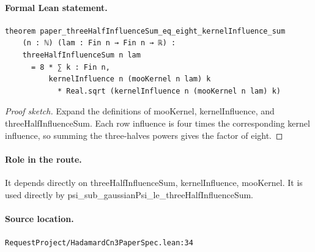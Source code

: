 \medskip
\paragraph{Formal Lean statement.}
\begin{verbatim}
theorem paper_threeHalfInfluenceSum_eq_eight_kernelInfluence_sum
    (n : ℕ) (lam : Fin n → Fin n → ℝ) :
    threeHalfInfluenceSum n lam
      = 8 * ∑ k : Fin n,
          kernelInfluence n (mooKernel n lam) k
            * Real.sqrt (kernelInfluence n (mooKernel n lam) k)
\end{verbatim}
\begin{proof}[Proof sketch]
Expand the definitions of mooKernel, kernelInfluence, and threeHalfInfluenceSum. Each row influence is four times the corresponding kernel influence, so summing the three-halves powers gives the factor of eight.
\end{proof}
\paragraph{Role in the route.}
It depends directly on threeHalfInfluenceSum, kernelInfluence, mooKernel. It is used directly by psi\_sub\_gaussianPsi\_le\_threeHalfInfluenceSum.
\paragraph{Source location.}
\texttt{RequestProject/HadamardCn3PaperSpec.lean:34}
\medskip
